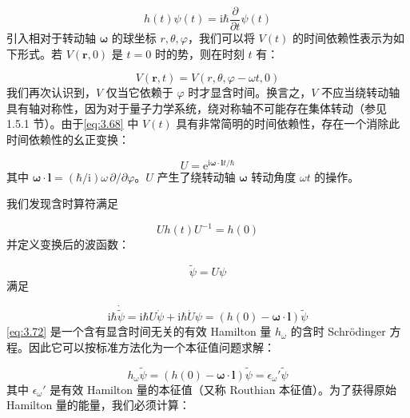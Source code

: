 \begin{equation}
h(t)\psi(t)=\mathrm{i}\hbar\frac{\partial}{\partial t}\psi(t)\label{eq:3.67}
\end{equation}
引入相对于转动轴 $\boldsymbol{\omega}$ 的球坐标 $r,\theta,\varphi$，我们可以将 $V(t)$
的时间依赖性表示为如下形式。若 $V(\boldsymbol{r},0)$ 是 $t=0$ 时的势，则在时刻 $t$ 有：

\begin{equation}
V(\boldsymbol{r},t)=V(r,\theta,\varphi-\omega t,0)\label{eq:3.68}
\end{equation}
我们再次认识到，$V$ 仅当它依赖于 $\varphi$ 时才显含时间。换言之，$V$ 不应当绕转动轴具有轴对称性，因为对于量子力学系统，绕对称轴不可能存在集体转动（参见
1.5.1 节）。由于\ref{eq:3.68} 中 $V(t)$ 具有非常简明的时间依赖性，存在一个消除此时间依赖性的幺正变换：

\begin{equation}
U=\mathrm{e}^{\mathrm{i}\boldsymbol{\omega}\cdot\boldsymbol{l}t/\hbar}\label{eq:3.69}
\end{equation}
其中 $\boldsymbol{\omega}\cdot\boldsymbol{l}=(\hbar/\mathrm{i})\omega\,\partial/\partial\varphi$。$U$
产生了绕转动轴 $\boldsymbol{\omega}$ 转动角度 $\omega t$ 的操作。

我们发现含时算符满足

\begin{equation}
Uh(t)U^{-1}=h(0)\label{eq:3.70}
\end{equation}
并定义变换后的波函数：

\begin{equation}
\tilde{\psi}=U\psi\label{eq:3.71}
\end{equation}
满足

\begin{equation}
\mathrm{i}\hbar\dot{\tilde{\psi}}=\mathrm{i}\hbar U\dot{\psi}+\mathrm{i}\hbar\dot{U}\psi=(h(0)-\boldsymbol{\omega}\cdot\boldsymbol{l})\tilde{\psi}\label{eq:3.72}
\end{equation}
\ref{eq:3.72} 是一个含有显含时间无关的有效 Hamilton 量 $h_{\omega}$ 的含时 Schrödinger
方程。因此它可以按标准方法化为一个本征值问题求解：

\begin{equation}
h_{\omega}\tilde{\psi}=(h(0)-\boldsymbol{\omega}\cdot\boldsymbol{l})\tilde{\psi}=\epsilon_{\omega}'\tilde{\psi}\label{eq:3.73}
\end{equation}
其中 $\epsilon_{\omega}'$ 是有效 Hamilton 量的本征值（又称 Routhian 本征值）。为了获得原始
Hamilton 量的能量，我们必须计算：

